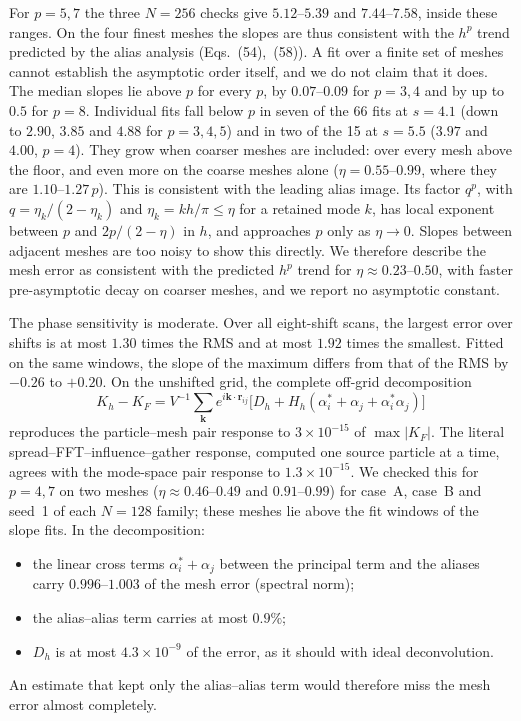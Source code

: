 For $p=5,7$ the three $N=256$ checks give $5.12$--$5.39$ and $7.44$--$7.58$, inside these ranges. On the four finest
meshes the slopes are thus consistent with the $h^p$ trend predicted by the alias analysis (Eqs.~(54),~(58)). A
fit over a finite set of meshes cannot establish the asymptotic order itself, and we do not claim that it does. The
median slopes lie above $p$ for every $p$, by $0.07$--$0.09$ for $p=3,4$ and by up to $0.5$ for $p=8$. Individual fits
fall below $p$ in seven of the 66 fits at $s=4.1$ (down to $2.90$, $3.85$ and $4.88$ for $p=3,4,5$) and in two of the
15 at $s=5.5$ ($3.97$ and $4.00$, $p=4$). They grow when coarser
meshes are included: over every mesh above the floor, and even more on the coarse meshes alone ($\eta=0.55$--$0.99$, where
they are $1.10$--$1.27\,p$). This is consistent with the leading alias image. Its factor $q^p$, with
$q=\eta_k/(2-\eta_k)$ and $\eta_k=kh/\pi\le\eta$ for a retained mode $k$, has local exponent between $p$ and
$2p/(2-\eta)$ in $h$, and approaches $p$ only as $\eta\to0$. Slopes between adjacent meshes are too noisy to show this
directly. We therefore describe the mesh error as consistent with the predicted $h^p$ trend for
$\eta\approx0.23$--$0.50$, with faster pre-asymptotic decay on coarser meshes, and we report no asymptotic constant.

The phase sensitivity is moderate. Over all eight-shift scans, the largest error over shifts is at most $1.30$ times
the RMS and at most $1.92$ times the smallest. Fitted on the same windows, the slope of the maximum differs from that of
the RMS by $-0.26$ to $+0.20$. On the unshifted grid, the complete off-grid decomposition
\[
K_h-K_F=V^{-1}\sum_{\mathbf k}e^{i\mathbf k\cdot\mathbf r_{ij}}\bigl[D_h+H_h(\alpha_i^*+\alpha_j+\alpha_i^*\alpha_j)\bigr]
\]
reproduces the particle--mesh pair response to $3\times10^{-15}$ of $\max|K_F|$. The literal spread--FFT--influence--gather
response, computed one source particle at a time, agrees with the mode-space pair response to $1.3\times10^{-15}$. We
checked this for $p=4,7$ on two meshes ($\eta\approx0.46$--$0.49$ and $0.91$--$0.99$) for case~A, case~B and seed~1 of
each $N=128$ family; these meshes lie above the fit windows of the slope fits. In the decomposition:
\begin{itemize}
\item the linear cross terms $\alpha_i^*+\alpha_j$ between the principal term and the aliases carry $0.996$--$1.003$ of
  the mesh error (spectral norm);
\item the alias--alias term carries at most $0.9\%$;
\item $D_h$ is at most $4.3\times10^{-9}$ of the error, as it should with ideal deconvolution.
\end{itemize}
An estimate that kept only the alias--alias term would therefore miss the mesh error almost completely.

